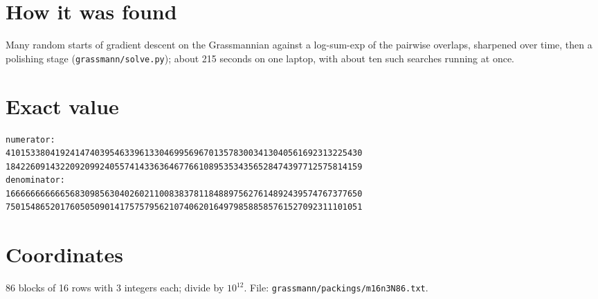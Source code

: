 \documentclass[11pt,a4paper]{article}
\begin{document}
\section{How it was found}
Many random starts of gradient descent on the Grassmannian against a log-sum-exp of the pairwise overlaps, sharpened over time, then a polishing stage (\texttt{grassmann/solve.py}); about 215 seconds on one laptop, with about ten such searches running at once.


\appendix
\section{Exact value}
{\small
\begin{verbatim}
numerator:
410153380419241474039546339613304699569670135783003413040561692313225430
184226091432209209924055741433636467766108953534356528474397712575814159
denominator:
166666666666568309856304026021100838378118488975627614892439574767377650
750154865201760505090141757579562107406201649798588585761527092311101051
\end{verbatim}}

\section{Coordinates}
86 blocks of 16 rows with 3 integers each; divide by $10^{12}$. File: \texttt{grassmann/packings/m16n3N86.txt}.
{\tiny
\begin{multicols}{3}
\end{multicols}}
\end{document}
